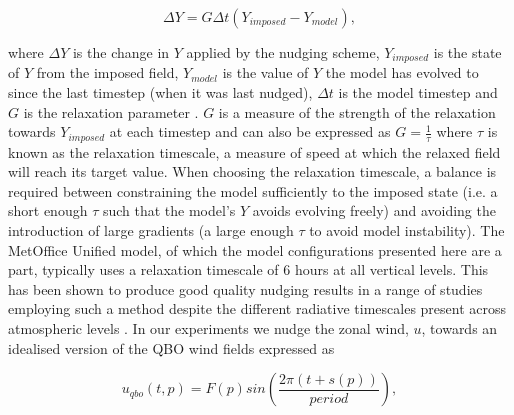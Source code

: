 \begin{equation} \label{eq:nudging}
\Delta Y = G \Delta t (Y_{imposed} - Y_{model}), 
\end{equation}

\noindent where $\Delta Y$ is the change in $Y$ applied by the nudging scheme, $Y_{imposed}$ is the state of $Y$ from the imposed field, $Y_{model}$ is the value of $Y$ the model has evolved to since the last timestep (when it was last nudged), $\Delta t$ is the model timestep and $G$ is the relaxation parameter \citep{telfordTechnical2008}. $G$ is a measure of the strength of the relaxation towards $Y_{imposed}$ at each timestep and can also be expressed as $G = \frac{1}{\tau}$ where $\tau$ is known as the relaxation timescale, a measure of speed at which the relaxed field will reach its target value. When choosing the relaxation timescale, a balance is required between constraining the model sufficiently to the imposed state (i.e. a short enough $\tau$ such that the model's $Y$ avoids evolving freely) and avoiding the introduction of large gradients (a large enough $\tau$ to avoid model instability). The MetOffice Unified model, of which the model configurations presented here are a part, typically uses a relaxation timescale of 6 hours at all vertical levels. This has been shown to produce good quality nudging results in a range of studies employing such a method despite the different radiative timescales present across atmospheric levels \citep{grayForecasting2020a}. In our experiments we nudge the zonal wind, $u$, towards an idealised version of the QBO wind fields expressed as 

\begin{equation} \label{eq:imposed_U}
u_{qbo}(t, p) = F(p) sin(\frac{2\pi (t + s(p))}{period}),
\end{equation}

